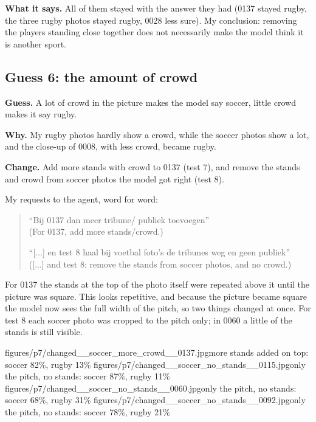 \documentclass[11pt]{article}
\begin{document}
\textbf{What it says.} All of them stayed with the answer they had (0137 stayed
rugby, the three rugby photos stayed rugby, 0028 less sure). My conclusion:
removing the players standing close together does not necessarily make the model
think it is another sport.

\subsection*{Guess 6: the amount of crowd}

\textbf{Guess.} A lot of crowd in the picture makes the model say soccer, little
crowd makes it say rugby.

\textbf{Why.} My rugby photos hardly show a crowd, while the soccer photos show a
lot, and the close-up of 0008, with less crowd, became rugby.

\textbf{Change.} Add more stands with crowd to 0137 (test 7), and remove the stands
and crowd from soccer photos the model got right (test 8).

My requests to the agent, word for word:
\begin{quote}
``Bij 0137 dan meer tribune/ publiek toevoegen''\\
(For 0137, add more stands/crowd.)

``[...] en test 8 haal bij voetbal foto’s de tribunes weg en geen publiek''\\
([...] and test 8: remove the stands from soccer photos, and no crowd.)
\end{quote}

For 0137 the stands at the top of the photo itself were repeated above it until the
picture was square. This looks repetitive, and because the picture became square
the model now sees the full width of the pitch, so two things changed at once. For
test 8 each soccer photo was cropped to the pitch only; in 0060 a little of the
stands is still visible.

           {figures/p7/changed__soccer_more_crowd__0137.jpg}{more stands added on top: soccer 82\%, rugby 13\%}
           {figures/p7/changed__soccer_no_stands__0115.jpg}{only the pitch, no stands: soccer 87\%, rugby 11\%}
           {figures/p7/changed__soccer_no_stands__0060.jpg}{only the pitch, no stands: soccer 68\%, rugby 31\%}
           {figures/p7/changed__soccer_no_stands__0092.jpg}{only the pitch, no stands: soccer 78\%, rugby 21\%}
\end{document}
